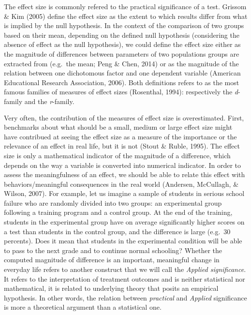 \documentclass[
  man,floatsintext]{apa6}
\begin{document}
The effect size is commonly refered to the practical significance of a test. Grissom \& Kim (2005) define the effect size as the extent to which results differ from what is implied by the null hypothesis. In the context of the comparison of two groups based on their mean, depending on the defined null hypothesis (considering the absence of effect as the null hypothesis), we could define the effect size either as the magnitude of differences between parameters of two populations groups are extracted from (e.g.~the mean; Peng \& Chen, 2014) or as the magnitude of the relation between one dichotomous factor and one dependent variable (American Educational Research Association, 2006). Both definitions refers to as the most famous families of measures of effect sizes (Rosenthal, 1994): respectively the \emph{d}-family and the \emph{r}-family.

Very often, the contribution of the measures of effect size is overestimated. First, benchmarks about what should be a small, medium or large effect size might have contribued at seeing the effect size as a measure of the importance or the relevance of an effect in real life, but it is not (Stout \& Ruble, 1995). The effect size is only a mathematical indicator of the magnitude of a difference, which depends on the way a variable is converted into numerical indicator. In order to assess the meaningfulness of an effect, we should be able to relate this effect with behaviors/meaningful consequences in the real world (Andersen, McCullagh, \& Wilson, 2007). For example, let us imagine a sample of students in serious school failure who are randomly divided into two groups: an experimental group following a training program and a control group. At the end of the training, students in the experimental group have on average significantly higher scores on a test than students in the control group, and the difference is large (e.g.~30 percents). Does it mean that students in the experimental condition will be able to pass to the next grade and to continue normal schooling? Whether the computed magnitude of difference is an important, meaningful change in everyday life refers to another construct that we will call the \emph{Applied significance}. It refers to the interpretation of treatment outcomes and is neither statistical nor mathematical, it is related to underlying theory that posits an empirical hypothesis. In other words, the relation between \emph{practical} and \emph{Applied} significance is more a theoretical argument than a statistical one.
\end{document}
